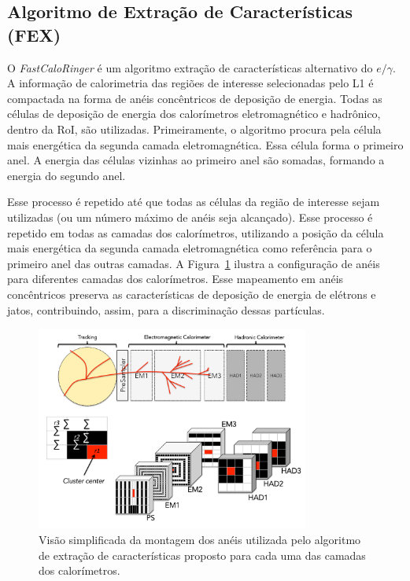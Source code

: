 \subsection{Algoritmo de Extração de Características (FEX)}

O \textit{FastCaloRinger} é um algoritmo extração de características alternativo do $e/\gamma$. A informação de calorimetria das regiões de interesse selecionadas pelo L1 é 
compactada na forma de anéis concêntricos de deposição de energia. Todas as células de deposição de energia dos calorímetros eletromagnético e hadrônico, dentro da RoI, são utilizadas. 
Primeiramente, o algoritmo procura pela célula mais energética da segunda camada eletromagnética. Essa célula forma o primeiro anel. A energia das células vizinhas ao primeiro anel são somadas, 
formando a energia do segundo anel. 

Esse processo é repetido até que todas as células da região de interesse sejam utilizadas (ou um número máximo de anéis seja alcançado). Esse processo é 
repetido em todas as camadas dos calorímetros, utilizando a posição da célula mais energética da segunda camada eletromagnética como referência para o primeiro anel das outras camadas. 
A Figura~\ref{fig:ringer_sketch} ilustra a configuração de anéis para diferentes camadas dos calorímetros. Esse mapeamento em anéis concêntricos preserva as características de deposição de 
energia de elétrons e jatos, contribuindo, assim, para a discriminação dessas partículas.

\begin{figure}[h!t]
\centering
\includegraphics[width=0.8\textwidth]{figures/ringerAlgorithmSketch.pdf}
\caption[Visão simplificada da montagem dos anéis utilizada pelo algoritmo de extração de características.]{Visão simplificada da montagem dos anéis 
utilizada pelo algoritmo de extração de características proposto para cada uma das camadas dos calorímetros.}
\label{fig:ringer_sketch}
\end{figure}

